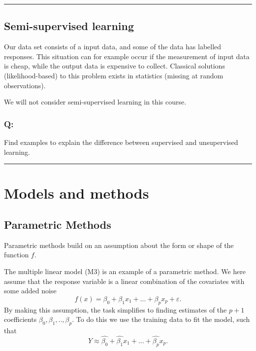 \documentclass[]{article}
\begin{document}
\begin{center}\rule{0.5\linewidth}{\linethickness}\end{center}

\hypertarget{semi-supervised-learning}{%
\subsection{Semi-supervised learning}\label{semi-supervised-learning}}

Our data set consists of a input data, and some of the data has labelled
responses. This situation can for example occur if the measurement of
input data is cheap, while the output data is expensive to collect.
Classical solutions (likelihood-based) to this problem exists in
statistics (missing at random observations).

We will not consider semi-supervised learning in this course.

\hypertarget{q-1}{%
\subsubsection{Q:}\label{q-1}}

Find examples to explain the difference between supervised and
unsupervised learning.

\begin{center}\rule{0.5\linewidth}{\linethickness}\end{center}

\hypertarget{models-and-methods}{%
\section{Models and methods}\label{models-and-methods}}

\hypertarget{parametric-methods}{%
\subsection{Parametric Methods}\label{parametric-methods}}

Parametric methods build on an assumption about the form or shape of the
function \(f\).

The multiple linear model (M3) is an example of a parametric method. We
here assume that the response variable is a linear combination of the
covariates with some added noise
\[f(x) = \beta_0 + \beta_1 x_1 + ... + \beta_p x_p+\varepsilon.\] By
making this assumption, the task simplifies to finding estimates of the
\(p+1\) coefficients \(\beta_0, \beta_1, .. ,\beta_p\). To do this we
use the training data to fit the model, such that
\[Y \approx \hat{\beta_0} + \hat{\beta_1} x_1 + ... + \hat{\beta_p} x_p.\]
\end{document}
